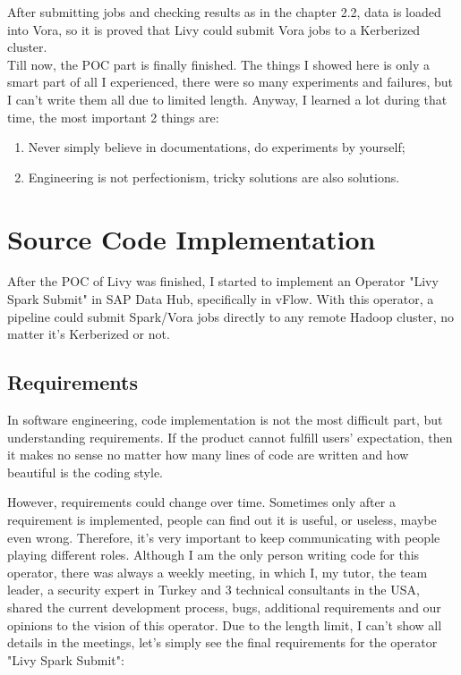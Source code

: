 \documentclass[article,colorback,accentcolor=tud4c]{tudreport}
\begin{document}
	After submitting jobs and checking results as in the chapter 2.2, data is loaded into Vora, so it is proved that Livy could submit Vora jobs to a Kerberized cluster.\\
	
	Till now, the POC part is finally finished. The things I showed here is only a smart part of all I experienced, there were so many experiments and failures, but I can't write them all due to limited length. Anyway, I learned a lot during that time, the most important 2 things are:
	
	\begin{enumerate}
		\item Never simply believe in documentations, do experiments by yourself;
		\item Engineering is not perfectionism, tricky solutions are also solutions.
	\end{enumerate}
	
\newpage

\section{Source Code Implementation}
\setcounter{table}{0}
\setcounter{figure}{0}

After the POC of Livy was finished, I started to implement an Operator "Livy Spark Submit" in SAP Data Hub, specifically in vFlow. With this operator, a pipeline could submit Spark/Vora jobs directly to any remote Hadoop cluster, no matter it's Kerberized or not. 

	\subsection{Requirements}
	In software engineering, code implementation is not the most difficult part, but understanding requirements. If the product cannot fulfill users' expectation, then it makes no sense no matter how many lines of code are written and how beautiful is the coding style. 
	
	However, requirements could change over time. Sometimes only after a requirement is implemented, people can find out it is useful, or useless, maybe even wrong. Therefore, it's very important to keep communicating with people playing different roles. Although I am the only person writing code for this operator, there was always a weekly meeting, in which I, my tutor, the team leader, a security expert in Turkey and 3 technical consultants in the USA, shared the current development process, bugs, additional requirements and our opinions to the vision of this operator. Due to the length limit, I can't show all details in the meetings, let's simply see the final requirements for the operator "Livy Spark Submit":
	
\end{document}
